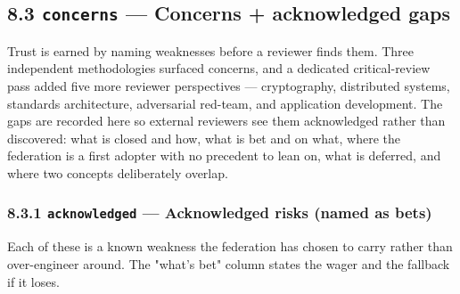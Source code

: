 \documentclass[11pt]{article}
\begin{document}
\subsection*{8.3 \texttt{concerns} — Concerns + acknowledged gaps}


Trust is earned by naming weaknesses before a reviewer finds them. Three independent methodologies surfaced concerns, and a dedicated critical-review pass added five more reviewer perspectives — cryptography, distributed systems, standards architecture, adversarial red-team, and application development. The gaps are recorded here so external reviewers see them acknowledged rather than discovered: what is closed and how, what is bet and on what, where the federation is a first adopter with no precedent to lean on, what is deferred, and where two concepts deliberately overlap.


\subsubsection*{8.3.1 \texttt{acknowledged} — Acknowledged risks (named as bets)}


Each of these is a known weakness the federation has chosen to carry rather than over-engineer around. The "what's bet" column states the wager and the fallback if it loses.
\end{document}
